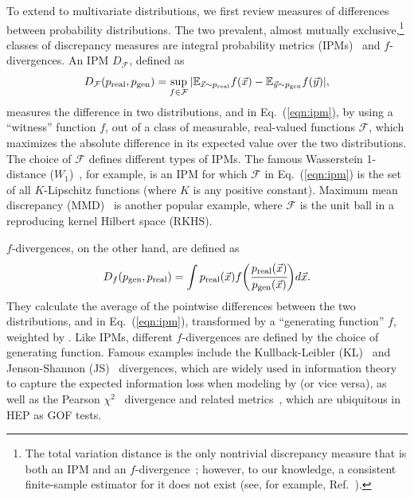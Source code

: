 To extend to multivariate distributions, we first review measures of differences between probability distributions.
The two prevalent, almost mutually exclusive,\footnote{The total variation distance is the only nontrivial discrepancy measure that is both an IPM and an $f$-divergence~\cite[Appendix A]{sriperumbudur_empirical}; however, to our knowledge, a consistent finite-sample estimator for it does not exist (see, for example, Ref.~\cite[Section 5]{sriperumbudur_empirical}).} classes of discrepancy measures are integral probability metrics (IPMs)~\cite{muller_ipms} and $f$-divergences.
An IPM $D_\mathcal{F}$, defined as
\
\begin{equation}\label{eqn:ipm}
    D_\mathcal{F}(p_\mathrm{real}, p_\mathrm{gen}) = \sup _{f \in \mathcal F} |\mathbb E_{\vec x \sim p_\mathrm{real}} f(\vec{x}) - \mathbb E_{\vec y \sim p_\mathrm{gen}} f(\vec y)|,
\end{equation}
measures the difference in two distributions,  and  in Eq.~(\ref{eqn:ipm}), by using a ``witness'' function $f$, out of a class of measurable, real-valued functions $\mathcal{F}$, which maximizes the absolute difference in its expected value over the two distributions.
The choice of $\mathcal{F}$ defines different types of IPMs.
The famous Wasserstein 1-distance ($W_1$)~\cite{wasserstein_original,villani_ot}, for example, is an IPM for which $\mathcal F$ in Eq.~(\ref{eqn:ipm}) is the set of all $K$-Lipschitz functions (where $K$ is any positive constant).
Maximum mean discrepancy (MMD)~\cite{gretton_mmd} is another popular example, where $\mathcal F$ is the unit ball in a reproducing kernel Hilbert space (RKHS).

$f$-divergences, on the other hand, are defined as
\begin{equation}\label{eqn:fdiv}
    D_f(p_\mathrm{gen}, p_\mathrm{real}) = \int p_\mathrm{real} (\vec x) f \bigg( \cfrac{p_\mathrm{real} (\vec x)}{p_\mathrm{gen} (\vec x)} \bigg ) d\vec x.
\end{equation}
They calculate the average of the pointwise differences between the two distributions,  and  in Eq.~(\ref{eqn:ipm}), transformed by a ``generating function'' $f$, weighted by .
Like IPMs, different $f$-divergences are defined by the choice of generating function.
Famous examples include the Kullback-Leibler (KL)~\cite{kl} and Jenson-Shannon (JS)~\cite{js_1,js_2} divergences, which are widely used in information theory to capture the expected information loss when modeling  by  (or vice versa), as well as the Pearson $\chi^2$~\cite{pearson} divergence and related metrics~\cite{Baker:1983tu,generalization_gof,parametric}, which are ubiquitous in HEP as GOF tests.

